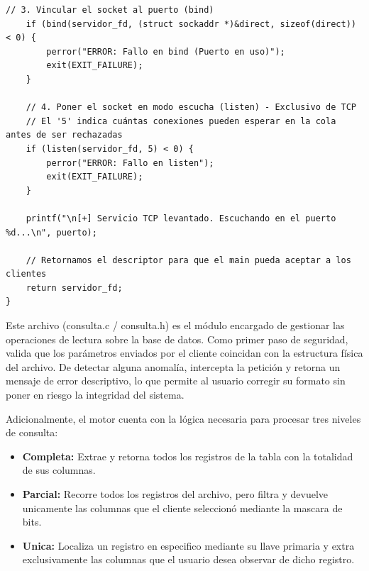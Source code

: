 \documentclass[12pt]{article}
\begin{document}
\begin{lstlisting}[style=estiloC ,title={Código 1. Servidor TCP (funciones.h)}]
    // 3. Vincular el socket al puerto (bind)
    if (bind(servidor_fd, (struct sockaddr *)&direct, sizeof(direct)) < 0) {
        perror("ERROR: Fallo en bind (Puerto en uso)");
        exit(EXIT_FAILURE);
    }

    // 4. Poner el socket en modo escucha (listen) - Exclusivo de TCP
    // El '5' indica cuántas conexiones pueden esperar en la cola antes de ser rechazadas
    if (listen(servidor_fd, 5) < 0) {
        perror("ERROR: Fallo en listen");
        exit(EXIT_FAILURE);
    }

    printf("\n[+] Servicio TCP levantado. Escuchando en el puerto %d...\n", puerto);
    
    // Retornamos el descriptor para que el main pueda aceptar a los clientes
    return servidor_fd;
}
\end{lstlisting}

Este archivo (consulta.c / consulta.h) es el módulo encargado de gestionar las operaciones de lectura sobre la base de datos. Como primer paso de seguridad, valida que los parámetros enviados por el cliente coincidan con la estructura física del archivo. De detectar alguna anomalía, intercepta la petición y retorna un mensaje de error descriptivo, lo que permite al usuario corregir su formato sin poner en riesgo la integridad del sistema.

Adicionalmente, el motor cuenta con la lógica necesaria para procesar tres niveles de consulta:

\begin{itemize}
    \item \textbf{Completa:} Extrae y retorna todos los registros de la tabla con la totalidad de sus columnas.
    \item \textbf{Parcial:} Recorre todos los registros del archivo, pero filtra y devuelve unicamente las columnas que el cliente seleccionó mediante la mascara de bits.
    \item \textbf{Unica:} Localiza un registro en especifico mediante su llave primaria y extra exclusivamente las columnas que el usuario desea observar de dicho registro.
\end{itemize}
\end{document}
